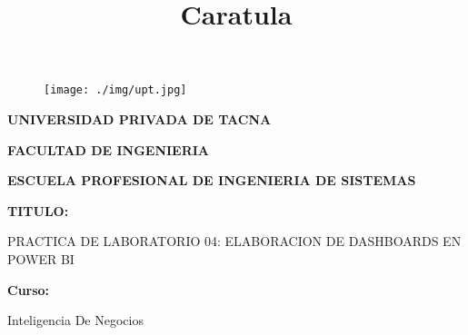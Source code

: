 \documentclass[12pt,letterpaper]{article}
\begin{document}
%

  
\title{Caratula}

\begin{titlepage}
    \begin{center}
    \begin{figure}[htb]
    \begin{center}
    \texttt{[image: ./img/upt.jpg]}
    \end{center}
    \end{figure}
    
    \vspace*{0.15in}
    \begin{Large}
    \textbf{UNIVERSIDAD PRIVADA DE TACNA}\\
    \end{Large}
    
    \vspace*{0.1in}
    \begin{Large}
    \textbf{FACULTAD DE INGENIERIA} \\
    \end{Large}
    
    \vspace*{0.1in}
    \begin{Large}
    \textbf{ESCUELA PROFESIONAL DE INGENIERIA DE SISTEMAS} \\
    \end{Large}
    
    \vspace*{0.5in}
    \begin{Large}
    \textbf{TITULO:}\\
    \end{Large}
    

\vspace*{0.1in}
\begin{Large}
    PRACTICA DE LABORATORIO 04: ELABORACION DE DASHBOARDS EN POWER BI\\
\end{Large}

\vspace*{0.3in}
\begin{Large}
\textbf{Curso:} \\
\end{Large}

\vspace*{0.1in}
\begin{large}
    Inteligencia De Negocios\\
\end{large}


\end{center}
\end{titlepage}
\end{document}
